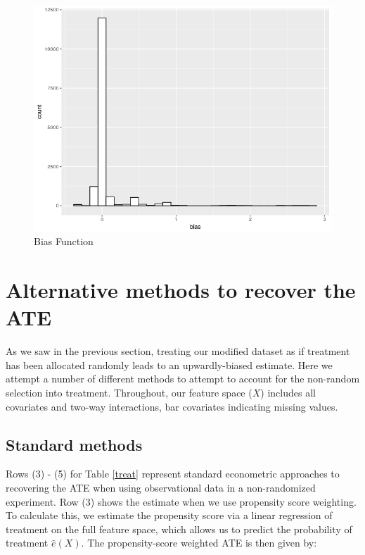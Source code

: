 \documentclass[paper=letter, fontsize=11pt]{scrartcl} %
\begin{document}
\begin{figure}[!ht]
\center
\caption{Bias Function  \label{bias}}
\includegraphics[scale=0.8]{bias.png}
\end{figure}

\section{Alternative methods to recover the ATE}

As we saw in the previous section, treating our modified dataset as if treatment has been allocated randomly leads to an upwardly-biased estimate. Here we attempt a number of different methods to attempt to account for the non-random selection into treatment. Throughout, our feature space ($X$) includes all covariates and two-way interactions, bar covariates indicating missing values.

\subsection{Standard methods}

Rows (3) - (5) for Table \ref{treat} represent standard econometric approaches to recovering the ATE when using observational data in a non-randomized experiment. Row (3) shows the estimate when we use propensity score weighting. To calculate this, we estimate the propensity score via a linear regression of treatment on the full feature space, which allows us to predict the probability of treatment $\hat{e}(X)$. The propensity-score weighted ATE is then given by:
\end{document}
